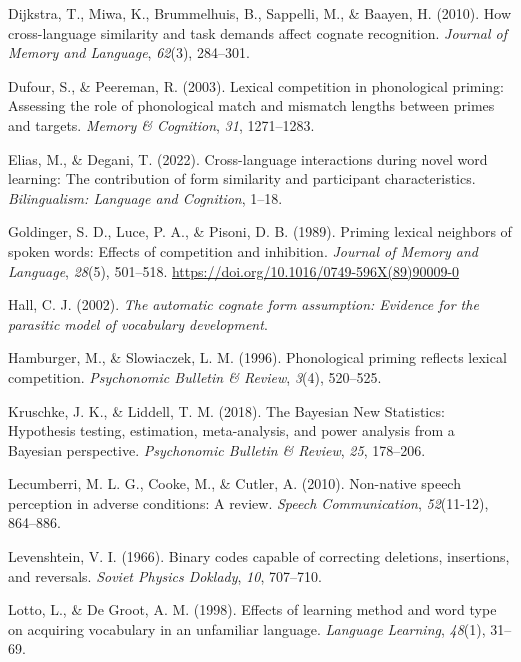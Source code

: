 \documentclass[
]{article}
\newlength{\cslhangindent}
\newenvironment{CSLReferences}[2] %
 {\begin{list}{}{%
  \setlength{\itemindent}{0pt}
  \setlength{\leftmargin}{0pt}
  \setlength{\parsep}{0pt}
  \ifodd #1
   \setlength{\leftmargin}{\cslhangindent}
   \setlength{\itemindent}{-1\cslhangindent}
  \fi
  \setlength{\itemsep}{#2\baselineskip}}}
 {\end{list}}
\begin{document}
\begin{CSLReferences}{1}{0}
Dijkstra, T., Miwa, K., Brummelhuis, B., Sappelli, M., \& Baayen, H.
(2010). How cross-language similarity and task demands affect cognate
recognition. \emph{Journal of Memory and Language}, \emph{62}(3),
284--301.

Dufour, S., \& Peereman, R. (2003). Lexical competition in phonological
priming: {Assessing} the role of phonological match and mismatch lengths
between primes and targets. \emph{Memory \& Cognition}, \emph{31},
1271--1283.

Elias, M., \& Degani, T. (2022). Cross-language interactions during
novel word learning: {The} contribution of form similarity and
participant characteristics. \emph{Bilingualism: Language and
Cognition}, 1--18.

Goldinger, S. D., Luce, P. A., \& Pisoni, D. B. (1989). Priming lexical
neighbors of spoken words: {Effects} of competition and inhibition.
\emph{Journal of Memory and Language}, \emph{28}(5), 501--518.
\url{https://doi.org/10.1016/0749-596X(89)90009-0}

Hall, C. J. (2002). \emph{The automatic cognate form assumption:
Evidence for the parasitic model of vocabulary development}.

Hamburger, M., \& Slowiaczek, L. M. (1996). Phonological priming
reflects lexical competition. \emph{Psychonomic Bulletin \& Review},
\emph{3}(4), 520--525.

Kruschke, J. K., \& Liddell, T. M. (2018). The {Bayesian New
Statistics}: {Hypothesis} testing, estimation, meta-analysis, and power
analysis from a {Bayesian} perspective. \emph{Psychonomic Bulletin \&
Review}, \emph{25}, 178--206.

Lecumberri, M. L. G., Cooke, M., \& Cutler, A. (2010). Non-native speech
perception in adverse conditions: {A} review. \emph{Speech
Communication}, \emph{52}(11-12), 864--886.

Levenshtein, V. I. (1966). Binary codes capable of correcting deletions,
insertions, and reversals. \emph{Soviet Physics Doklady}, \emph{10},
707--710.

Lotto, L., \& De Groot, A. M. (1998). Effects of learning method and
word type on acquiring vocabulary in an unfamiliar language.
\emph{Language Learning}, \emph{48}(1), 31--69.


\end{CSLReferences}
\end{document}
